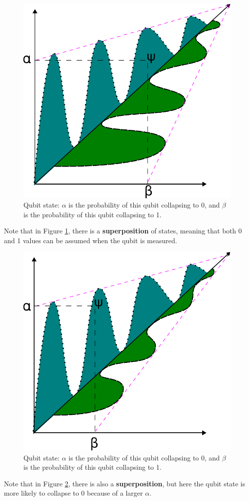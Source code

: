 		\begin{figure}[H]
			\centering
			\includegraphics[width=0.5\linewidth]{images/photonState01}
			\caption[Qubit state]{Qubit state: $\alpha$ is the probability of this qubit collapsing to 0, and $\beta$ is the probability of this qubit collapsing to 1.}
			\label{fig:photonstate01}
		\end{figure}
		
		\par Note that in Figure \ref{fig:photonstate01}, there is a \textbf{superposition} of states, meaning that both 0 and 1 values can be assumed when the qubit is measured.\newline
		
		\begin{figure}[H]
			\centering
			\includegraphics[width=0.5\linewidth]{images/photonState02}
			\caption[Qubit state 2]{Qubit state: $\alpha$ is the probability of this qubit collapsing to 0, and $\beta$ is the probability of this qubit collapsing to 1.}
			\label{fig:photonstate02}
		\end{figure}
		
		\par Note that in Figure \ref{fig:photonstate02}, there is also a \textbf{superposition}, but here the qubit state is more likely to collapse to 0 because of a larger $\alpha$.\newline
		
